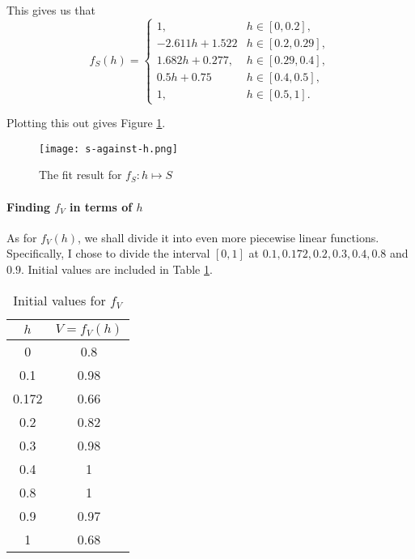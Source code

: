 This gives us that
\[
    f_S(h) = \begin{cases}
        1,              & h \in [0, 0.2],    \\
        -2.611h + 1.522 & h \in [0.2, 0.29], \\
        1.682h + 0.277, & h \in [0.29, 0.4], \\
        0.5h + 0.75     & h \in [0.4, 0.5],  \\
        1,              & h \in [0.5, 1].
    \end{cases}
\]

Plotting this out gives Figure \ref{fig:s-against-h}.

\begin{figure}[htp]
    \centering
    \texttt{[image: s-against-h.png]}
    \caption{The fit result for \(f_S: h \mapsto S\)}
    \label{fig:s-against-h}
\end{figure}

\paragraph{Finding \(f_V\) in terms of \(h\)}

As for \(f_V(h)\), we shall divide it into even more piecewise linear functions. Specifically, I chose to divide the interval \([0, 1]\) at \(0.1, 0.172, 0.2, 0.3, 0.4, 0.8\) and \(0.9\). Initial values are included in Table \ref{tab:v-against-h-iv}.

\begin{table}[htp]
    \centering

    \begin{tabular}{|c|c|}
        \hline
        \(h\) & \(V = f_V(h)\) \\
        \hline
        0     & 0.8            \\
        0.1   & 0.98           \\
        0.172 & 0.66           \\
        0.2   & 0.82           \\
        0.3   & 0.98           \\
        0.4   & 1              \\
        0.8   & 1              \\
        0.9   & 0.97           \\
        1     & 0.68           \\
        \hline
    \end{tabular}
    \caption{Initial values for \(f_V\)}
    \label{tab:v-against-h-iv}
\end{table}

